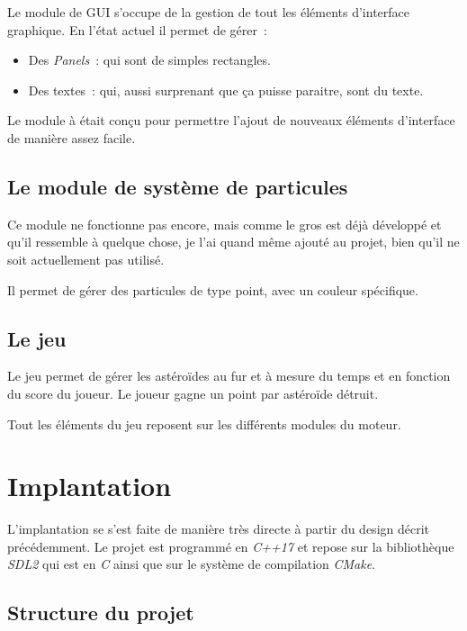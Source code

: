 \documentclass[10pt, french, a4paper]{report}
\begin{document}
Le module de GUI s'occupe de la gestion de tout les éléments d'interface graphique.
En l'état actuel il permet de gérer~:
\begin{itemize}
	\item Des \textit{Panels}~: qui sont de simples rectangles.
	\item Des textes~: qui, aussi surprenant que ça puisse paraitre, sont du texte.
\end{itemize}

Le module à était conçu pour permettre l'ajout de nouveaux éléments d'interface de 
manière assez facile. 

\section{Le module de système de particules}

Ce module ne fonctionne pas encore, mais comme le gros est déjà développé et qu'il 
ressemble à quelque chose, je l'ai quand même ajouté au projet, bien qu'il ne soit 
actuellement pas utilisé.

Il permet de gérer des particules de type point, avec un couleur spécifique.

\section{Le jeu}

Le jeu permet de gérer les astéroïdes au fur et à mesure du temps et en fonction 
du score du joueur. 
Le joueur gagne un point par astéroïde détruit. 

Tout les éléments du jeu reposent sur les différents modules du moteur.


\chapter{Implantation}

L'implantation se s'est faite de manière très directe à partir du design décrit 
précédemment.
Le projet est programmé en \textit{C++17} et repose sur la bibliothèque \textit{SDL2}
qui est en \textit{C} ainsi que sur le système de compilation \textit{CMake}.

\section{Structure du projet}
\end{document}
